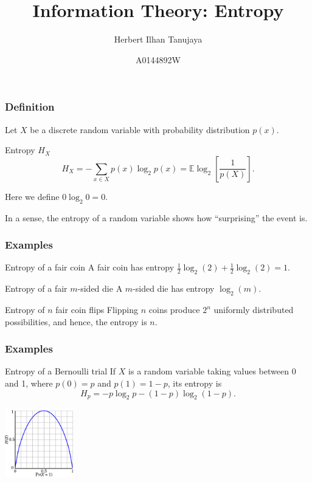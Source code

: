 \documentclass{beamer}
\title{Information Theory: Entropy}
\author{Herbert Ilhan Tanujaya}
\date{A0144892W}
\newcommand{\ls}{\left[}
\newcommand{\rs}{\right]}
\begin{document}
\begin{frame}
  \titlepage
\end{frame}

\begin{frame}
  \frametitle{Definition}
  Let $X$ be a discrete random variable with probability distribution $p(x)$.
  \begin{block}{Entropy $H_X$}
    \[ H_X = - \sum_{x \in X} p(x) \log_2 p(x) = \mathbb{E} \log_2 \ls \frac{1}{p(X)} \rs. \]
  \end{block}
  Here we define $0 \log_2 0 = 0$.

  In a sense, the entropy of a random variable shows how ``surprising'' the event is.
\end{frame}

\begin{frame}
  \frametitle{Examples}
  \begin{exampleblock}{Entropy of a fair coin}
    A fair coin has entropy $\frac{1}{2} \log_2(2) + \frac{1}{2} \log_2(2) = 1$.
  \end{exampleblock}

  \begin{exampleblock}{Entropy of a fair $m$-sided die}
    A $m$-sided die has entropy $\log_2(m)$.
  \end{exampleblock}

  \begin{exampleblock}{Entropy of $n$ fair coin flips}
    Flipping $n$ coins produce $2^n$ uniformly distributed possibilities, and hence, the entropy is $n$.
  \end{exampleblock}
\end{frame}

\begin{frame}
  \frametitle{Examples}

  \begin{exampleblock}{Entropy of a Bernoulli trial}
    If $X$ is a random variable taking values between 0 and 1, where $p(0) = p$ and $p(1) = 1 - p$, its entropy is \[ H_p = -p \log_2 p - (1 - p) \log_2 (1 - p). \]

    \begin{center}
      \includegraphics[width=3cm]{bernoulli.png}
    \end{center}
  \end{exampleblock}
\end{frame}
\end{document}
